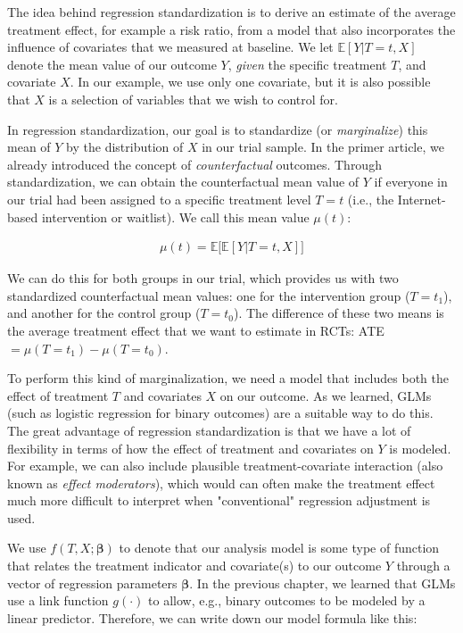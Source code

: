 The idea behind regression standardization is to derive an estimate of the average treatment effect, for example a risk ratio, from a model that also incorporates the influence of covariates that we measured at baseline. We let $\mathbb{E}[Y|T=t,X]$ denote the mean value of our outcome $Y$, \emph{given} the specific treatment $T$, and covariate $X$. In our example, we use only one covariate, but it is also possible that $X$ is a selection of variables that we wish to control for.  

In regression standardization, our goal is to standardize (or \emph{marginalize}) this mean of $Y$ by the distribution of $X$ in our trial sample. In the primer article, we already introduced the concept of \emph{counterfactual} outcomes. Through standardization, we can obtain the counterfactual mean value of $Y$ if everyone in our trial had been assigned to a specific treatment level $T=t$ (i.e., the Internet-based intervention or waitlist). We call this mean value $\mu(t)$:

\begin{align}
\mu(t) = \mathbb{E}\bigg[\mathbb{E}[Y|T=t,X]\bigg]
\end{align}

We can do this for both groups in our trial, which provides us with two standardized counterfactual mean values: one for the intervention group ($T=t_1$), and another for the control group ($T=t_0$). The difference of these two means is the average treatment effect that we want to estimate in RCTs: ATE $=\mu(T=t_1) - \mu(T=t_0)$.

To perform this kind of marginalization, we need a model that includes both the effect of treatment $T$ and covariates $X$ on our outcome. As we learned, GLMs (such as logistic regression for binary outcomes) are a suitable way to do this. The great advantage of regression standardization is that we have a lot of flexibility in terms of how the effect of treatment and covariates on $Y$ is modeled. For example, we can also include plausible treatment-covariate interaction (also known as \emph{effect moderators}), which would can often make the treatment effect much more difficult to interpret when "conventional" regression adjustment is used.

We use $f(T,X;\boldsymbol{\beta})$ to denote that our analysis model is some type of function that relates the treatment indicator and covariate(s) to our outcome $Y$ through a vector of regression parameters $\boldsymbol{\beta}$. In the previous chapter, we learned that GLMs use a link function $g(\cdot)$ to allow, e.g., binary outcomes to be modeled by a linear predictor. Therefore, we can write down our model formula like this:

